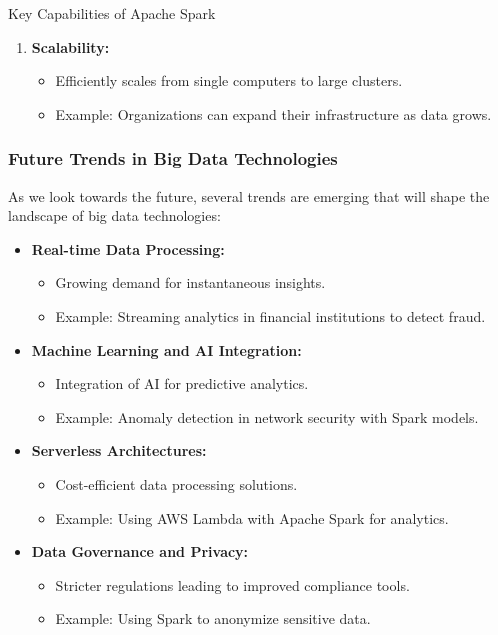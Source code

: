 \documentclass[aspectratio=169]{beamer}
\begin{document}
\begin{frame}[fragile]
\begin{block}{Key Capabilities of Apache Spark}
\begin{enumerate}
            \item \textbf{Scalability:}
            \begin{itemize}
                \item Efficiently scales from single computers to large clusters.
                \item Example: Organizations can expand their infrastructure as data grows.
            \end{itemize}
        \end{enumerate}
    \end{block}
\end{frame}

\begin{frame}[fragile]
    \frametitle{Future Trends in Big Data Technologies}
    
    As we look towards the future, several trends are emerging that will shape the landscape of big data technologies:

    \begin{itemize}
        \item \textbf{Real-time Data Processing:}
        \begin{itemize}
            \item Growing demand for instantaneous insights.
            \item Example: Streaming analytics in financial institutions to detect fraud.
        \end{itemize}

        \item \textbf{Machine Learning and AI Integration:}
        \begin{itemize}
            \item Integration of AI for predictive analytics.
            \item Example: Anomaly detection in network security with Spark models.
        \end{itemize}
        
        \item \textbf{Serverless Architectures:}
        \begin{itemize}
            \item Cost-efficient data processing solutions.
            \item Example: Using AWS Lambda with Apache Spark for analytics.
        \end{itemize}

        \item \textbf{Data Governance and Privacy:}
        \begin{itemize}
            \item Stricter regulations leading to improved compliance tools.
            \item Example: Using Spark to anonymize sensitive data.
        \end{itemize}
        

\end{itemize}
\end{frame}
\end{document}
